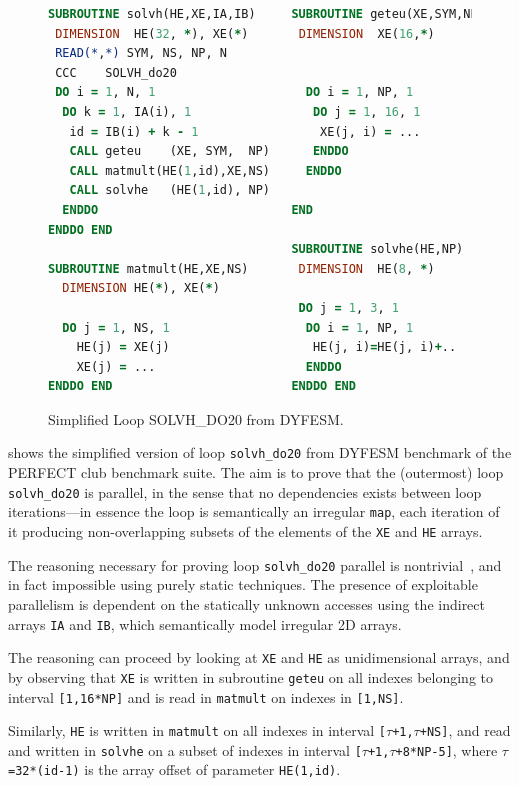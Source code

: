 \begin{figure}[bt]

\begin{lstlisting}[xleftmargin=0pt,language=fortran]
SUBROUTINE solvh(HE,XE,IA,IB)     SUBROUTINE geteu(XE,SYM,NP)
 DIMENSION  HE(32, *), XE(*)       DIMENSION  XE(16,*)
 READ(*,*) SYM, NS, NP, N
 CCC    SOLVH_do20
 DO i = 1, N, 1                     DO i = 1, NP, 1
  DO k = 1, IA(i), 1                 DO j = 1, 16, 1
   id = IB(i) + k - 1                 XE(j, i) = ...
   CALL geteu    (XE, SYM,  NP)      ENDDO
   CALL matmult(HE(1,id),XE,NS)     ENDDO
   CALL solvhe   (HE(1,id), NP)
  ENDDO                           END
ENDDO END
                                  SUBROUTINE solvhe(HE,NP)
SUBROUTINE matmult(HE,XE,NS)       DIMENSION  HE(8, *)
  DIMENSION HE(*), XE(*)
                                   DO j = 1, 3, 1
  DO j = 1, NS, 1                   DO i = 1, NP, 1
    HE(j) = XE(j)                    HE(j, i)=HE(j, i)+..
    XE(j) = ...                     ENDDO
ENDDO END                         ENDDO END
\end{lstlisting}

\caption{Simplified Loop SOLVH\_DO20 from DYFESM.}
\label{fig:SolvhDO20Code}
\end{figure}

 shows the simplified version of loop
\texttt{solvh\_do20} from DYFESM benchmark of the PERFECT club
benchmark suite.
%
The aim is to prove that the (outermost) loop \texttt{solvh\_do20} is
parallel, in the sense that no dependencies exists between loop
iterations---in essence the loop is semantically an irregular
\texttt{map}, each iteration of it producing non-overlapping subsets
of the elements of the \texttt{XE} and \texttt{HE} arrays.

The reasoning necessary for proving loop \texttt{solvh\_do20} parallel
is nontrivial~\cite{CosPLDI}, and in fact impossible using purely
static techniques.  The presence of exploitable parallelism is
dependent on the statically unknown accesses using the indirect arrays
\texttt{IA} and \texttt{IB}, which semantically model irregular 2D
arrays.

The reasoning can proceed by looking at \texttt{XE} and \texttt{HE} as
unidimensional arrays, and by observing that \texttt{XE} is written in
subroutine \texttt{geteu} on all indexes belonging to interval
\texttt{[1,16*NP]} and is read in \texttt{matmult} on indexes in
\texttt{[1,NS]}.

Similarly, \texttt{HE} is written in \texttt{matmult} on all indexes in interval
\texttt{[$\tau$+1,$\tau$+NS]}, and read and written in \texttt{solvhe} on a subset
of indexes in interval \texttt{[$\tau$+1,$\tau$+8*NP-5]}, where
$\tau$\texttt{=32*(id-1)} is the array offset of parameter \texttt{HE(1,id)}.

